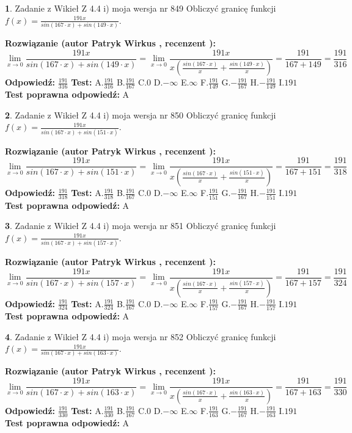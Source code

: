 \documentclass[12pt, a4paper]{article}
\theoremstyle{definition} %
\newtheorem{zad}{}
\newcommand{\zadStart}[1]{\begin{zad}#1\newline}
\newcommand{\zadStop}{\end{zad}}
\newcommand{\rozwStart}[2]{\noindent \textbf{Rozwiązanie (autor #1 , recenzent #2): }\newline}
\newcommand{\rozwStop}{\newline}
\newcommand{\odpStart}{\noindent \textbf{Odpowiedź:}\newline}
\newcommand{\odpStop}{\newline}
\newcommand{\testStart}{\noindent \textbf{Test:}\newline}
\newcommand{\testStop}{\newline}
\newcommand{\kluczStart}{\noindent \textbf{Test poprawna odpowiedź:}\newline}
\newcommand{\kluczStop}{\newline}
\begin{document}
\zadStart{Zadanie z Wikieł Z 4.4 i) moja wersja nr 849}
Obliczyć granicę funkcji $f(x)=\frac{191x}{sin(167\cdot x) +sin(149\cdot x)}$.
\zadStop
\rozwStart{Patryk Wirkus}{}
$$\lim\limits_{x\to 0}\frac{191x}{sin(167\cdot x) +sin(149\cdot x)}=\lim\limits_{x\to 0}\frac{191x}{x(\frac{sin(167\cdot x)}{x}+\frac{sin(149\cdot x)}{x})}=\frac{191}{167+149} = \frac{191}{316}$$
\rozwStop
\odpStart
$\frac{191}{316}$
\odpStop
\testStart
A.$\frac{191}{316}$
B.$\frac{191}{167}$
C.$0$
D.$-\infty$
E.$\infty$
F.$\frac{191}{149}$
G.$-\frac{191}{167}$
H.$-\frac{191}{149}$
I.$191$
\testStop
\kluczStart
A
\kluczStop



\zadStart{Zadanie z Wikieł Z 4.4 i) moja wersja nr 850}
Obliczyć granicę funkcji $f(x)=\frac{191x}{sin(167\cdot x) +sin(151\cdot x)}$.
\zadStop
\rozwStart{Patryk Wirkus}{}
$$\lim\limits_{x\to 0}\frac{191x}{sin(167\cdot x) +sin(151\cdot x)}=\lim\limits_{x\to 0}\frac{191x}{x(\frac{sin(167\cdot x)}{x}+\frac{sin(151\cdot x)}{x})}=\frac{191}{167+151} = \frac{191}{318}$$
\rozwStop
\odpStart
$\frac{191}{318}$
\odpStop
\testStart
A.$\frac{191}{318}$
B.$\frac{191}{167}$
C.$0$
D.$-\infty$
E.$\infty$
F.$\frac{191}{151}$
G.$-\frac{191}{167}$
H.$-\frac{191}{151}$
I.$191$
\testStop
\kluczStart
A
\kluczStop



\zadStart{Zadanie z Wikieł Z 4.4 i) moja wersja nr 851}
Obliczyć granicę funkcji $f(x)=\frac{191x}{sin(167\cdot x) +sin(157\cdot x)}$.
\zadStop
\rozwStart{Patryk Wirkus}{}
$$\lim\limits_{x\to 0}\frac{191x}{sin(167\cdot x) +sin(157\cdot x)}=\lim\limits_{x\to 0}\frac{191x}{x(\frac{sin(167\cdot x)}{x}+\frac{sin(157\cdot x)}{x})}=\frac{191}{167+157} = \frac{191}{324}$$
\rozwStop
\odpStart
$\frac{191}{324}$
\odpStop
\testStart
A.$\frac{191}{324}$
B.$\frac{191}{167}$
C.$0$
D.$-\infty$
E.$\infty$
F.$\frac{191}{157}$
G.$-\frac{191}{167}$
H.$-\frac{191}{157}$
I.$191$
\testStop
\kluczStart
A
\kluczStop



\zadStart{Zadanie z Wikieł Z 4.4 i) moja wersja nr 852}
Obliczyć granicę funkcji $f(x)=\frac{191x}{sin(167\cdot x) +sin(163\cdot x)}$.
\zadStop
\rozwStart{Patryk Wirkus}{}
$$\lim\limits_{x\to 0}\frac{191x}{sin(167\cdot x) +sin(163\cdot x)}=\lim\limits_{x\to 0}\frac{191x}{x(\frac{sin(167\cdot x)}{x}+\frac{sin(163\cdot x)}{x})}=\frac{191}{167+163} = \frac{191}{330}$$
\rozwStop
\odpStart
$\frac{191}{330}$
\odpStop
\testStart
A.$\frac{191}{330}$
B.$\frac{191}{167}$
C.$0$
D.$-\infty$
E.$\infty$
F.$\frac{191}{163}$
G.$-\frac{191}{167}$
H.$-\frac{191}{163}$
I.$191$
\testStop
\kluczStart
A
\kluczStop
\end{document}
